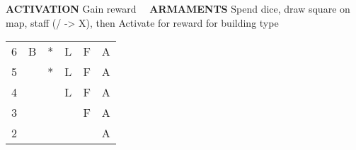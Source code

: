 \begin{flushleft}
\textbf{ACTIVATION} \textcolor{supplemental}{Gain reward} \ \ \textbf{ARMAMENTS} \textcolor{supplemental}{Spend dice, draw square on map, staff (/ -> X), then Activate for reward}
\newline \textcolor{supplemental}{for building type}
\end{flushleft}
\begin{tabular}{|l|lllll}
\cline{1-1}
6 & \cellcolor{supplemental}B & *                         & L                         & F                         & A                         \\ \cline{1-1}
5 &                           & \cellcolor{supplemental}* & L                         & F                         & A                         \\ \cline{1-1}
4 &                           &                           & \cellcolor{supplemental}L & F                         & A                         \\ \cline{1-1}
3 &                           &                           &                           & \cellcolor{supplemental}F & A                         \\ \cline{1-1}
2 &                           &                           &                           &                           & \cellcolor{supplemental}A \\ \cline{1-1}
\end{tabular}

